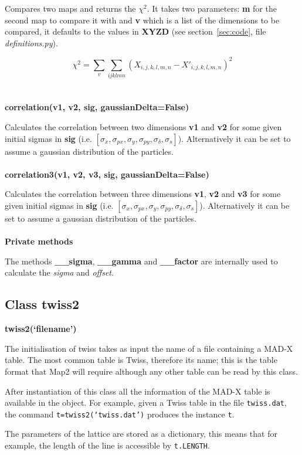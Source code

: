 \documentclass[a4paper]{cernatsnote}
\begin{document}
Compares two maps and returns the $\chi^2$. It takes two parameters:
\textbf{m} for the second map to compare it with and \textbf{v} which
is a list of the dimensions to be compared, it defaults to the values
in \textbf{XYZD} (see section~\ref{sec:code}, file
\textit{definitions.py}).

\[\chi^2 = \sum_{v} \sum_{ijklmn} \left(X_{i,j,k,l,m,n} - X'_{i,j,k,l,m,n} \right)^2\]
\\\\
\textbf{correlation(v1, v2, sig, gaussianDelta=False)}

Calculates the correlation between two dimensions \textbf{v1} and
\textbf{v2} for some given initial sigmas in \textbf{sig} (i.e.
$[\sigma_x,  \sigma_{px}, \sigma_y,  \sigma_{py}, \sigma_\delta,
  \sigma_s]$). Alternatively it can be set to assume a gaussian
distribution of the particles.
\\\\
\textbf{correlation3(v1, v2, v3, sig, gaussianDelta=False)}

Calculates the correlation between three dimensions \textbf{v1},
\textbf{v2} and \textbf{v3} for some given initial sigmas in
\textbf{sig} (i.e. $[\sigma_x, \sigma_{px}, \sigma_y,  \sigma_{py},
  \sigma_\delta, \sigma_s]$). Alternatively it can be set to assume a
gaussian distribution of the particles.
\\\\
\textbf{Private methods}

The methods \textbf{\_\_sigma}, \textbf{\_\_gamma} and \textbf{\_\_factor}
are internally used to calculate the \textit{sigma} and \textit{offset}.

\subsection{Class twiss2}
\label{sec:twiss}

\textbf{twiss2(`filename')}

The initialisation of twiss takes as input the name of a file
containing a MAD-X table. The most common table is Twiss, therefore its
name; this is the table format that Map2 will require although any
other table can be read by this class.

After instantiation of this class all the information of the MAD-X
table is available in the object. For example, given a Twiss table in
the file \texttt{twiss.dat}, the command \texttt{t=twiss2(`twiss.dat')}
produces the instance \texttt{t}.

The parameters of the lattice are stored as a dictionary, this means
that for example, the length of the line is accessible by
\texttt{t.LENGTH}.
\end{document}
